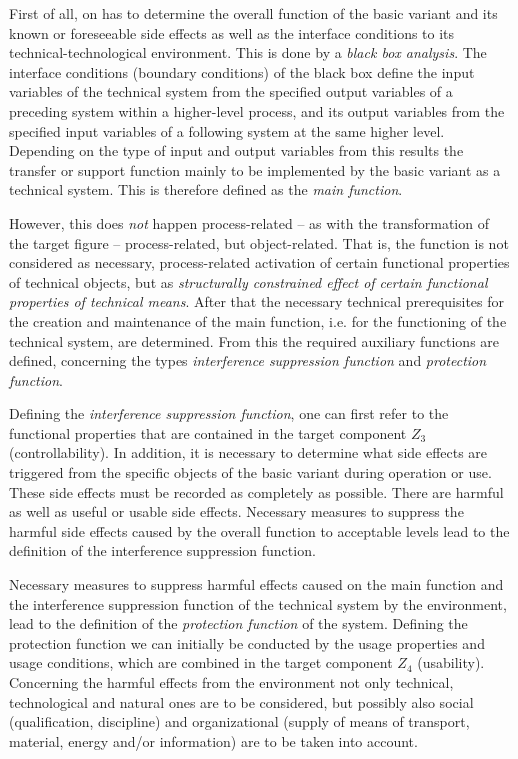 \documentclass[11pt,a4paper]{article}
\begin{document}
First of all, on has to determine the overall function of the basic variant
and its known or foreseeable side effects as well as the interface conditions
to its technical-technological environment. This is done by a \emph{black box
  analysis}.  The interface conditions (boundary conditions) of the black box
define the input variables of the technical system from the specified output
variables of a preceding system within a higher-level process, and its output
variables from the specified input variables of a following system at the same
higher level. Depending on the type of input and output variables from this
results the transfer or support function mainly to be implemented by the basic
variant as a technical system. This is therefore defined as the \emph{main
  function}.

However, this does \emph{not} happen process-related -- as with the
transformation of the target figure -- process-related, but object-related.
That is, the function is not considered as necessary, process-related
activation of certain functional properties of technical objects, but as
\emph{structurally constrained effect of certain functional properties of
  technical means}. After that the necessary technical prerequisites for the
creation and maintenance of the main function, i.e. for the functioning of the
technical system, are determined. From this the required auxiliary functions
are defined, concerning the types \emph{interference suppression function} and
\emph{protection function}.

Defining the \emph{interference suppression function}, one can first refer to
the functional properties that are contained in the target component $Z_3$
(controllability).  In addition, it is necessary to determine what side
effects are triggered from the specific objects of the basic variant during
operation or use. These side effects must be recorded as completely as
possible.  There are harmful as well as useful or usable side effects.
Necessary measures to suppress the harmful side effects caused by the overall
function to acceptable levels lead to the definition of the interference
suppression function.

Necessary measures to suppress harmful effects caused on the main function and
the interference suppression function of the technical system by the
environment, lead to the definition of the \emph{protection function} of the
system. Defining the protection function we can initially be conducted by the
usage properties and usage conditions, which are combined in the target
component $Z_4$ (usability). Concerning the harmful effects from the
environment not only technical, technological and natural ones are to be
considered, but possibly also social (qualification, discipline) and
organizational (supply of means of transport, material, energy and/or
information) are to be taken into account.
\end{document}
